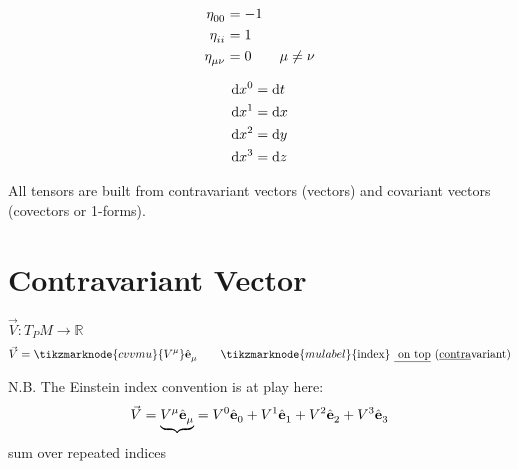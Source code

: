 \documentclass{article}
\begin{document}
\vspace{-12pt} \begin{align*}
    \tensor{\eta}{_0_0} &= -1 \\
    \tensor{\eta}{_i_i} &= 1 \\
    \tensor{\eta}{_\mu_\nu} &= 0 \qquad \mu \neq \nu \\
\end{align*}

\vspace{-48pt} \begin{align*}
    \mathrm{d}\tensor{x}{^0} &= \mathrm{d}t \\
    \mathrm{d}\tensor{x}{^1} &= \mathrm{d}x \\
    \mathrm{d}\tensor{x}{^2} &= \mathrm{d}y \\
    \mathrm{d}\tensor{x}{^3} &= \mathrm{d}z
\end{align*}

\noindent All tensors are built from contravariant vectors (vectors) and covariant vectors (covectors or 1-forms).

\section*{Contravariant Vector}
$\vec{V} : T_P M \rightarrow \mathbb{R}$
\begin{equation*}
    \vec{V} = \tikzmarknode{cvvmu}{\tensor{V}{^\mu}} \tensor{\hat{\mathbf{e}}}{_\mu} \qquad \tikzmarknode{mulabel}{\text{index}} \text{ \underline{ on top} (\underline{contra}variant)} 
\end{equation*}


\noindent N.B. The Einstein index convention is at play here:
\begin{equation*}
    \vec{V} = \underbrace{ \tensor{V}{^\mu} \tensor{\hat{\mathbf{e}}}{_\mu} } = \tensor{V}{^0} \tensor{\hat{\mathbf{e}}}{_0} + \tensor{V}{^1} \tensor{\hat{\mathbf{e}}}{_1} + \tensor{V}{^2} \tensor{\hat{\mathbf{e}}}{_2} + \tensor{V}{^3} \tensor{\hat{\mathbf{e}}}{_3}
\end{equation*}
\hspace{2.2in} sum over repeated indices
\end{document}

